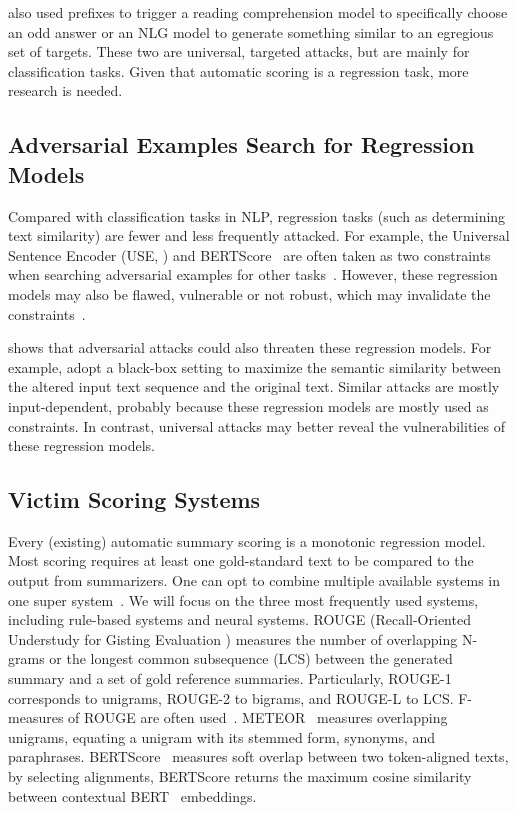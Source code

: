 \documentclass[11pt]{article}
\theoremstyle{remark}
\begin{document}
\citeauthor{wallace-etal-2019-universal} also used prefixes to trigger a reading comprehension model to specifically choose an odd answer or an NLG model to generate something similar to an egregious set of targets. These two are universal, targeted attacks, but are mainly for classification tasks. Given that automatic scoring is a regression task, more research is needed.

\subsection{Adversarial Examples Search for Regression Models}
Compared with classification tasks in NLP, regression tasks (such as determining text similarity) are fewer and less frequently attacked. For example, the Universal Sentence Encoder (USE, \citealp{cer-etal-2018-universal}) and BERTScore~\cite{zhang2019bertscore} are often taken as two constraints when searching adversarial examples for other tasks~\cite{alzantot-etal-2018-generating}. However, these regression models may also be flawed, vulnerable or not robust, which may invalidate the constraints~\cite{morris-2020-second}.

\citet{morris-2020-second} shows that adversarial attacks could also threaten these regression models. For example, \citet{maheshwary2021generating} adopt a black-box setting to maximize the semantic similarity between the altered input text sequence and the original text. Similar attacks are mostly input-dependent, probably because these regression models are mostly used as constraints. In contrast, universal attacks may better reveal the vulnerabilities of these regression models.





\subsection{Victim Scoring Systems}
Every (existing) automatic summary scoring is a monotonic regression model. Most scoring requires at least one gold-standard text to be compared to the output from summarizers. One can opt to combine multiple available systems in one super system~\cite{lamontagne2006combining}. We will focus on the three most frequently used systems, including rule-based systems and neural systems. ROUGE (Recall-Oriented Understudy for Gisting Evaluation \citealp{lin-2004-rouge}) measures the number of overlapping N-grams or the longest common subsequence (LCS) between the generated summary and a set of gold reference summaries. Particularly, ROUGE-1 corresponds to unigrams, ROUGE-2 to bigrams, and ROUGE-L to LCS. F-measures of ROUGE are often used~\cite{see-etal-2017-get}. METEOR~\cite{banerjee-lavie-2005-meteor} measures overlapping unigrams, equating a unigram with its stemmed form, synonyms, and paraphrases. BERTScore~\cite{zhang2019bertscore} measures soft overlap between two token-aligned texts, by selecting alignments, BERTScore returns the maximum cosine similarity between contextual BERT~\cite{devlin-etal-2019-bert} embeddings.
\end{document}
